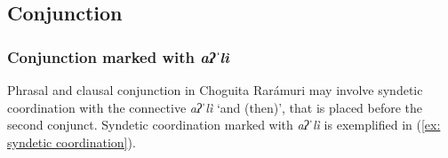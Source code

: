 \subsection{Conjunction}
\label{subsec: conjunction}

\subsubsection{Conjunction marked with \textit{aʔˈlì}}
\label{subsubsec: conjunction marked with ali}

Phrasal and clausal conjunction in Choguita Rarámuri may involve syndetic coordination with the connective \textit{aʔˈlì} ‘and (then)', that is placed before the second conjunct. Syndetic coordination marked with \textit{aʔˈlì} is exemplified in (\ref{ex: syndetic coordination}).

\ea\label{ex: syndetic coordination}

